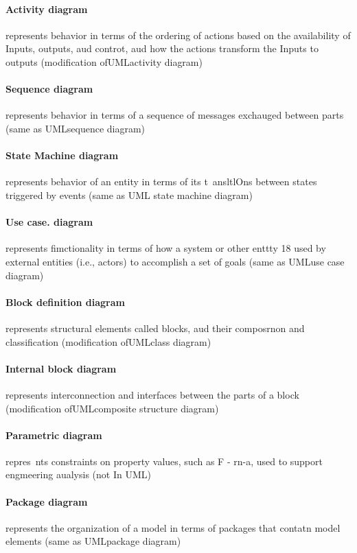 \documentclass[a4paper,12pt,twoside]{report}
\begin{document}
{			\paragraph{Activity diagram} {represents behavior in terms of the ordering of actions based on the availability of Inputs, outputs, aud controt, aud how the actions transform the Inputs to outputs (modification ofUMLactivity diagram)
			}
			\paragraph{Sequence diagram} {represents behavior in terms of a sequence of messages exchauged between parts (same as UMLsequence diagram)
			}
			\paragraph{State Machine diagram} {represents behavior of an entity in terms of its t~ansltlOns between states triggered by events (same as UML state machine diagram)
			}
			\paragraph{Use case. diagram} {represents fimctionality in terms of how a system or other enttty 18 used by external entities (i.e., actors) to accomplish a set of goals (same as UMLuse case diagram)
			}
			\paragraph{Block definition diagram} {represents structural elements called blocks, aud their composrnon and classification (modification ofUMLclass diagram)
			}
			\paragraph{Internal block diagram} {represents interconnection and interfaces between the parts of a block (modification ofUMLcomposite structure diagram)
			}
			\paragraph{Parametric diagram} {repres~nts constraints on property values, such as F - rn-a, used to support engmeering aualysis
			(not In UML)
			}
			\paragraph{Package diagram} {represents the organization of a model in terms of packages that contatn model elements (same as UMLpackage diagram)
			}
		
}
\end{document}
